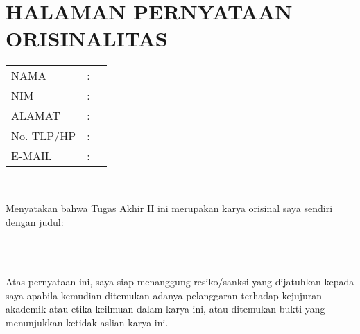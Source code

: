 \chapter*{\uppercase{halaman pernyataan orisinalitas}}

\vspace*{0.4cm}
\noindent 

\noindent
\begin{tabular}{ll p{10cm}}
	NAMA&: & \penulis \\
	NIM&: & \nim \\
	ALAMAT&: & \alamat \\
	No. TLP/HP&: & \tlp \\
	E-MAIL&: & \email \\
\end{tabular} \\

\vspace*{1.0cm}

\noindent Menyatakan bahwa Tugas Akhir II ini merupakan karya orisinal saya sendiri dengan judul:\\
\begin{center}
	\textbf{\judul}\\[0.5cm]
	\textit{\Judulen}\\[1.0cm]
\end{center}
\noindent Atas pernyataan ini, saya siap menanggung resiko/sanksi yang dijatuhkan kepada saya apabila kemudian ditemukan adanya pelanggaran terhadap kejujuran akademik atau etika keilmuan dalam karya ini, atau ditemukan bukti yang menunjukkan ketidak aslian karya ini.\\



\newpage